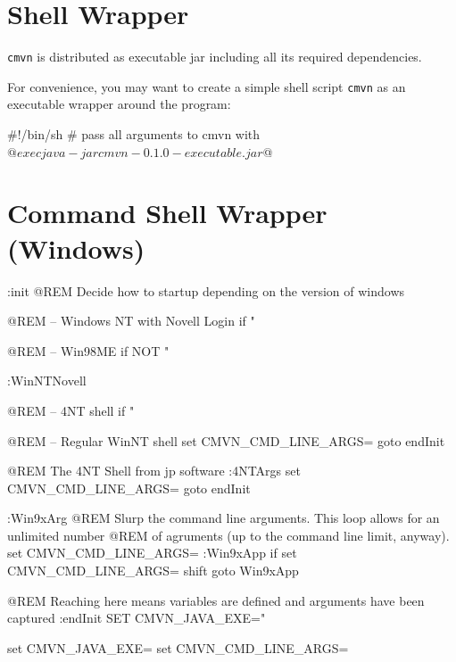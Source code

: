 \documentclass[a4paper,12pt,english,oneside,halfparskip]{scrartcl}
\newcommand{\cmvn}{\texttt{cmvn}}
\newcommand{\code}[1]{\texttt{#1}}
\begin{document}
\clearpage
\appendix

\section{Shell Wrapper}

\cmvn{} is distributed as executable jar including all its required dependencies. 

For convenience, you may want to create a simple shell script \code{cmvn} as an executable wrapper around the program:

\begin{Cmdline}[caption={Shell wrapper: \code{mvu}}]
#!/bin/sh
# pass all arguments to cmvn with $@
exec java -jar cmvn-0.1.0-executable.jar $@
\end{Cmdline}

\section{Command Shell Wrapper (Windows)}

\begin{Cmdline}[caption={Windows Command Shell wrapper: \code{cmvn.bat}}]
:init
@REM Decide how to startup depending on the version of windows

@REM -- Windows NT with Novell Login
if "%

@REM -- Win98ME
if NOT "%

:WinNTNovell

@REM -- 4NT shell
if "%

@REM -- Regular WinNT shell
set CMVN_CMD_LINE_ARGS=%
goto endInit

@REM The 4NT Shell from jp software
:4NTArgs
set CMVN_CMD_LINE_ARGS=%
goto endInit

:Win9xArg
@REM Slurp the command line arguments.  This loop allows for an unlimited number
@REM of agruments (up to the command line limit, anyway).
set CMVN_CMD_LINE_ARGS=
:Win9xApp
if %
set CMVN_CMD_LINE_ARGS=%
shift
goto Win9xApp

@REM Reaching here means variables are defined and arguments have been captured
:endInit
SET CMVN_JAVA_EXE="%


set CMVN_JAVA_EXE=
set CMVN_CMD_LINE_ARGS=
\end{Cmdline}
\end{document}

